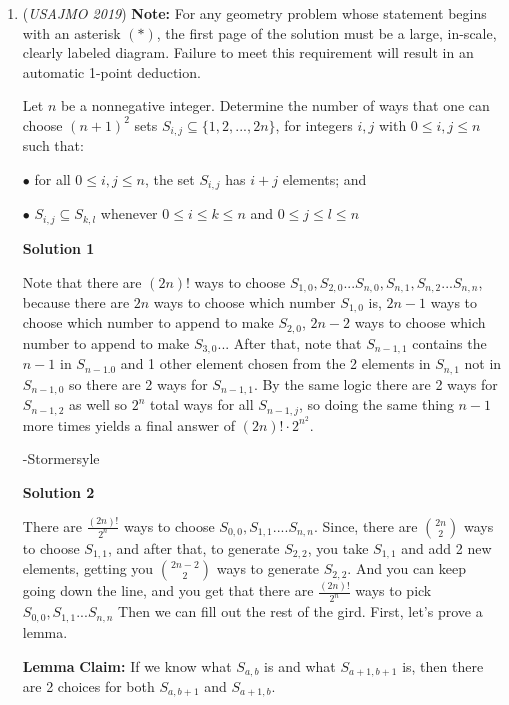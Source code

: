 \begin{enumerate}
 


	\item (\textit{USAJMO 2019}) \textbf{Note:} For any geometry problem whose statement begins with an asterisk $(*)$, the first page of the solution must be a large, in-scale, clearly labeled diagram. Failure to meet this requirement will result in an automatic 1-point deduction.


 Let $n$ be a nonnegative integer. Determine the number of ways that one can choose $(n+1)^2$ sets $S_{i,j} \subseteq \{1,2,...,2n\}$, for integers $i,j$ with $0 \le i,j \le n$ such that:


 $\bullet$ for all $0 \le i,j \le n$, the set $S_{i,j}$ has $i+j$ elements; and


 $\bullet$ $S_{i,j} \subseteq S_{k,l}$ whenever $0 \le i \le k \le n$ and $0 \le j \le l \le n$




\textbf{Solution 1}

Note that there are $(2n)!$ ways to choose $S_{1, 0}, S_{2, 0}... S_{n, 0}, S_{n, 1}, S_{n, 2}... S_{n, n}$, because there are $2n$ ways to choose which number $S_{1, 0}$ is, $2n-1$ ways to choose which number to append to make $S_{2, 0}$, $2n-2$ ways to choose which number to append to make $S_{3, 0}$... After that, note that $S_{n-1, 1}$ contains the $n-1$ in $S_{n-1. 0}$ and 1 other element chosen from the 2 elements in $S_{n, 1}$ not in $S_{n-1, 0}$ so there are 2 ways for $S_{n-1, 1}$. By the same logic there are 2 ways for $S_{n-1, 2}$ as well so $2^n$ total ways for all $S_{n-1, j}$, so doing the same thing $n-1$ more times yields a final answer of $(2n)!\cdot 2^{n^2}$.

 -Stormersyle

 



\textbf{Solution 2}

There are $\frac{(2n)!}{2^n}$ ways to choose $S_{0,0}, S_{1,1} .... S_{n,n}$. Since, there are $\binom{2n}{2}$ ways to choose $S_{1,1}$, and after that, to generate $S_{2,2}$, you take $S_{1,1}$ and add 2 new elements, getting you $\binom{2n-2}{2}$ ways to generate $S_{2,2}$. And you can keep going down the line, and you get that there are $\frac{(2n)!}{2^n}$ ways to pick $S_{0,0}, S_{1,1} ... S_{n,n}$ Then we can fill out the rest of the gird. First, let’s prove a lemma.

 \textbf{Lemma} \textbf{Claim:} If we know what $S_{a,b}$ is and what $S_{a+1,b+1}$ is, then there are 2 choices for both $S_{a,b+1}$ and $S_{a+1,b}$. 


\end{enumerate}

